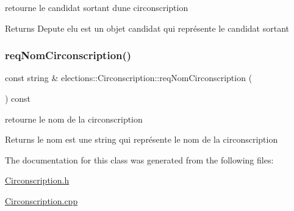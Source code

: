retourne le candidat sortant d\textquotesingle{}une circonscription 

\begin{DoxyReturn}{Returns}
Depute elu est un objet candidat qui représente le candidat sortant 
\end{DoxyReturn}
\mbox{\label{classelections_1_1Circonscription_adbacabf731fe2afccc919b8bd8c4eae8}} 
\subsubsection{\texorpdfstring{req\+Nom\+Circonscription()}{reqNomCirconscription()}}
{\footnotesize\ttfamily const string \& elections\+::\+Circonscription\+::req\+Nom\+Circonscription (\begin{DoxyParamCaption}{ }\end{DoxyParamCaption}) const}



retourne le nom de la circonscription 

\begin{DoxyReturn}{Returns}
le nom est une string qui représente le nom de la circonscription 
\end{DoxyReturn}


The documentation for this class was generated from the following files\+:\begin{DoxyCompactItemize}
\item 
\hyperlink{Circonscription_8h}{Circonscription.\+h}\item 
\hyperlink{Circonscription_8cpp}{Circonscription.\+cpp}\end{DoxyCompactItemize}

